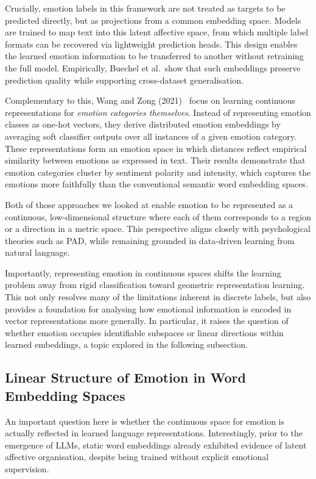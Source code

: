 \documentclass[12pt,twoside]{report}
\begin{document}
Crucially, emotion labels in this framework are not treated as targets to be predicted directly, but as projections from a common embedding space. Models are trained to map text into this latent affective space, from which multiple label formats can be recovered via lightweight prediction heads. This design enables the learned emotion information to be transferred to another without retraining the full model. Empirically, Buechel et al.\ show that such embeddings preserve prediction quality while supporting cross-dataset generalisation.

Complementary to this, Wang and Zong (2021)~\cite{wang-zong-2021-distributed} focus on learning continuous representations for \emph{emotion categories themselves}. Instead of representing emotion classes as one-hot vectors, they derive distributed emotion embeddings by averaging soft classifier outputs over all instances of a given emotion category. These representations form an emotion space in which distances reflect empirical similarity between emotions as expressed in text. Their results demonstrate that emotion categories cluster by sentiment polarity and intensity, which captures the emotions more faithfully than the conventional semantic word embedding spaces. 

Both of those approaches we looked at enable emotion to be represented as a continuous, low-dimensional structure where each of them corresponds to a region or a direction in a metric space. This perspective aligns closely with psychological theories such as PAD, while remaining grounded in data-driven learning from natural language.

Importantly, representing emotion in continuous spaces shifts the learning problem away from rigid classification toward geometric representation learning. This not only resolves many of the limitations inherent in discrete labels, but also provides a foundation for analysing how emotional information is encoded in vector representations more generally. In particular, it raises the question of whether emotion occupies identifiable subspaces or linear directions within learned embeddings, a topic explored in the following subsection.

\subsection{Linear Structure of Emotion in Word Embedding Spaces} \label{linear_word_embedding}

An important question here is whether the continuous space for emotion is actually reflected in learned language representations. Interestingly, prior to the emergence of LLMs, static word embeddings already exhibited evidence of latent affective organisation, despite being trained without explicit emotional supervision.
\end{document}
